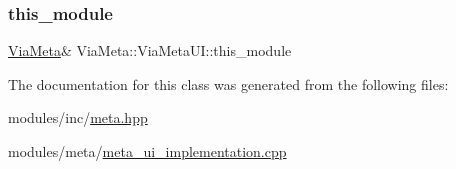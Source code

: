 \subsubsection{\texorpdfstring{this\+\_\+module}{this\_module}}
{\footnotesize\ttfamily \mbox{\hyperlink{class_via_meta}{Via\+Meta}}\& Via\+Meta\+::\+Via\+Meta\+U\+I\+::this\+\_\+module}



The documentation for this class was generated from the following files\+:\begin{DoxyCompactItemize}
\item 
modules/inc/\mbox{\hyperlink{meta_8hpp}{meta.\+hpp}}\item 
modules/meta/\mbox{\hyperlink{meta__ui__implementation_8cpp}{meta\+\_\+ui\+\_\+implementation.\+cpp}}\end{DoxyCompactItemize}
